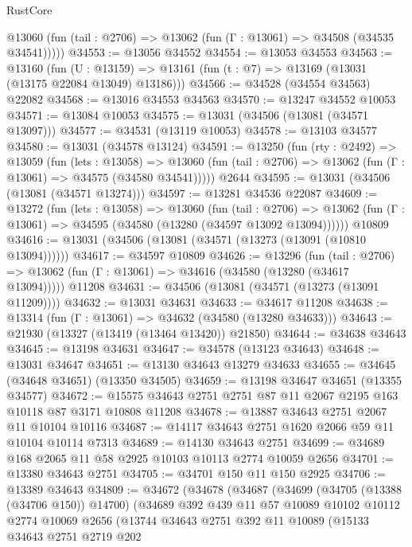 \begin{lexlean}{RustCore}
\begin{coremodule}
      @13060 (fun (tail : @2706) => @13062 (fun (Γ : @13061) => @34508 (@34535 @34541)))))
@34553 := @13056 @34552
@34554 := @13053 @34553
@34563 := @13160
    (fun (U : @13159) => @13161 (fun (t : @7) => @13169 (@13031 (@13175 @22084 @13049) @13186)))
@34566 := @34528 (@34554 @34563) @22082
@34568 := @13016 @34553 @34563
@34570 := @13247 @34552 @10053
@34571 := @13084 @10053
@34575 := @13031 (@34506 (@13081 (@34571 @13097)))
@34577 := @34531 (@13119 @10053)
@34578 := @13103 @34577
@34580 := @13031 (@34578 @13124)
@34591 := @13250
    (fun (rty : @2492) =>
    @13059
      (fun (lets : @13058) =>
      @13060 (fun (tail : @2706) => @13062 (fun (Γ : @13061) => @34575 (@34580 @34541)))))
    @2644
@34595 := @13031 (@34506 (@13081 (@34571 @13274)))
@34597 := @13281 @34536 @22087
@34609 := @13272
    (fun (lets : @13058) =>
    @13060
      (fun (tail : @2706) =>
      @13062 (fun (Γ : @13061) => @34595 (@34580 (@13280 (@34597 @13092 @13094))))))
    @10809
@34616 := @13031 (@34506 (@13081 (@34571 (@13273 (@13091 (@10810 @13094))))))
@34617 := @34597 @10809
@34626 := @13296
    (fun (tail : @2706) => @13062 (fun (Γ : @13061) => @34616 (@34580 (@13280 (@34617 @13094)))))
    @11208
@34631 := @34506 (@13081 (@34571 (@13273 (@13091 @11209))))
@34632 := @13031 @34631
@34633 := @34617 @11208
@34638 := @13314 (fun (Γ : @13061) => @34632 (@34580 (@13280 @34633)))
@34643 := @21930 (@13327 (@13419 (@13464 @13420)) @21850)
@34644 := @34638 @34643
@34645 := @13198 @34631
@34647 := @34578 (@13123 @34643)
@34648 := @13031 @34647
@34651 := @13130 @34643 @13279 @34633
@34655 := @34645 (@34648 @34651) (@13350 @34505)
@34659 := @13198 @34647 @34651 (@13355 @34577)
@34672 := @15575 @34643 @2751 @2751 @87 @11 @2067 @2195 @163 @10118 @87 @3171 @10808 @11208
@34678 := @13887 @34643 @2751 @2067 @11 @10104 @10116
@34687 := @14117 @34643 @2751 @1620 @2066 @59 @11 @10104 @10114 @7313
@34689 := @14130 @34643 @2751
@34699 := @34689 @168 @2065 @11 @58 @2925 @10103 @10113 @2774 @10059 @2656
@34701 := @13380 @34643 @2751
@34705 := @34701 @150 @11 @150 @2925
@34706 := @13389 @34643
@34809 := @34672
    (@34678
      (@34687
        (@34699
          (@34705 (@13388 (@34706 @150)) @14700)
          (@34689
            @392
            @439
            @11
            @57
            @10089
            @10102
            @10112
            @2774
            @10069
            @2656
            (@13744
              @34643
              @2751
              @392
              @11
              @10089
              (@15133
                @34643
                @2751
                @2719
                @202

\end{coremodule}
\end{lexlean}
